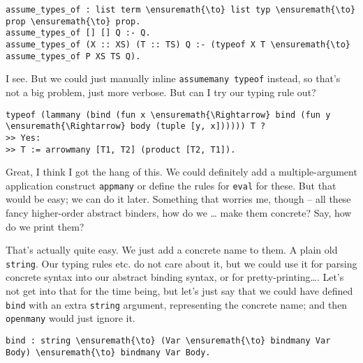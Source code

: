 \heroNEEDFEEDBACK{}

\begingroup\color{todo}

\begin{verbatim}
assume_types_of : list term \ensuremath{\to} list typ \ensuremath{\to} prop \ensuremath{\to} prop.
assume_types_of [] [] Q :- Q.
assume_types_of (X :: XS) (T :: TS) Q :- (typeof X T \ensuremath{\to} assume_types_of P XS TS Q).
\end{verbatim}

\endgroup

\heroSTUDENT{} I see. But we could just manually inline
\texttt{assumemany\ typeof} instead, so that's not a big problem, just
more verbose. But can I try our typing rule out?

\begin{verbatim}
typeof (lammany (bind (fun x \ensuremath{\Rightarrow} bind (fun y \ensuremath{\Rightarrow} body (tuple [y, x]))))) T ?
>> Yes:
>> T := arrowmany [T1, T2] (product [T2, T1]).
\end{verbatim}

Great, I think I got the hang of this. We could definitely add a
multiple-argument application construct \texttt{appmany} or define the
rules for \texttt{eval} for these. But that would be easy; we can do it
later. Something that worries me, though -- all these fancy higher-order
abstract binders, how do we \ldots{} make them concrete? Say, how do we
print them?

\heroADVISOR{} That's actually quite easy. We just add a concrete name to
them. A plain old \texttt{string}. Our typing rules etc. do not care
about it, but we could use it for parsing concrete syntax into our
abstract binding syntax, or for pretty-printing\ldots{}. Let's not get
into that for the time being, but let's just say that we could have
defined \texttt{bind} with an extra \texttt{string} argument,
representing the concrete name; and then \texttt{openmany} would just
ignore it.

\begin{verbatim}
bind : string \ensuremath{\to} (Var \ensuremath{\to} bindmany Var Body) \ensuremath{\to} bindmany Var Body.
\end{verbatim}

